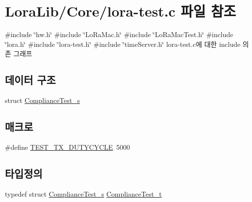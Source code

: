 \hypertarget{lora-test_8c}{}\section{Lora\+Lib/\+Core/lora-\/test.c 파일 참조}
\label{lora-test_8c}
{\ttfamily \#include \char`\"{}hw.\+h\char`\"{}}\newline
{\ttfamily \#include \char`\"{}Lo\+Ra\+Mac.\+h\char`\"{}}\newline
{\ttfamily \#include \char`\"{}Lo\+Ra\+Mac\+Test.\+h\char`\"{}}\newline
{\ttfamily \#include \char`\"{}lora.\+h\char`\"{}}\newline
{\ttfamily \#include \char`\"{}lora-\/test.\+h\char`\"{}}\newline
{\ttfamily \#include \char`\"{}time\+Server.\+h\char`\"{}}\newline
lora-\/test.c에 대한 include 의존 그래프
\subsection*{데이터 구조}
\begin{DoxyCompactItemize}
\item 
struct \mbox{\hyperlink{struct_compliance_test__s}{Compliance\+Test\+\_\+s}}
\end{DoxyCompactItemize}
\subsection*{매크로}
\begin{DoxyCompactItemize}
\item 
\#define \mbox{\hyperlink{lora-test_8c_aad2182ae6fe516e22d6393ca3a357896}{T\+E\+S\+T\+\_\+\+T\+X\+\_\+\+D\+U\+T\+Y\+C\+Y\+C\+LE}}~5000
\end{DoxyCompactItemize}
\subsection*{타입정의}
\begin{DoxyCompactItemize}
\item 
typedef struct \mbox{\hyperlink{struct_compliance_test__s}{Compliance\+Test\+\_\+s}} \mbox{\hyperlink{lora-test_8c_a53a6b20274f31e34166b30bb372bb6aa}{Compliance\+Test\+\_\+t}}
\end{DoxyCompactItemize}
